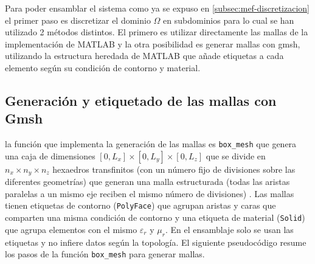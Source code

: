 \documentclass[12pt]{report} %
\begin{document}
Para poder ensamblar el sistema como ya se expuso en \autoref{subsec:mef-discretizacion} el primer paso es discretizar el dominio $\Omega$ en subdominios para lo cual se han utilizado 2 métodos distintos. El primero es utilizar directamente las mallas de la implementación de MATLAB \cite{amor2022zenodo} y la otra posibilidad es generar mallas con gmsh, utilizando la estructura heredada de MATLAB que añade etiquetas a cada elemento según su condición de contorno y material.

\subsection{Generación y etiquetado de las mallas con Gmsh}\label{sec:gmsh}

la función que implementa la generación de las mallas es \texttt{box\_mesh} que genera una caja de dimensiones  $[0,L_x]\times[0,L_y]\times[0,L_z]$ que se divide en $n_x\times n_y\times n_z$ hexaedros transfinitos (con un número fijo de divisiones sobre las diferentes geometrías) que generan una malla estructurada (todas las aristas paralelas a un mismo eje
reciben el mismo número de divisiones) \cite{gmshmanual}. Las mallas tienen etiquetas de contorno (\texttt{PolyFace}) que agrupan aristas y caras que comparten una misma condición de contorno y una etiqueta de material (\texttt{Solid}) que agrupa elementos con el mismo $\varepsilon_r$ y $\mu_r$. En el ensamblaje solo se usan las etiquetas y no infiere datos según la topología.
El siguiente pseudocódigo resume los pasos de la función \texttt{box\_mesh} para generar mallas.
\end{document}
